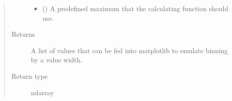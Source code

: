 \documentclass[letterpaper,10pt,english]{sphinxmanual}
\begin{document}
\begin{fulllineitems}
\begin{quote}
\begin{description}
\begin{itemize}
\item {} 
 (\sphinxstyleliteralemphasis{\sphinxupquote{ (}}\sphinxstyleliteralemphasis{\sphinxupquote{)}}) \textendash{} A predefined maximum that the calculating function should use.

\end{itemize}

\item[{Returns}] \leavevmode
{} \textendash{} A list of values that can be fed into matplotlib to emulate binning by
a value width.

\item[{Return type}] \leavevmode
ndarray

\end{description}\end{quote}

\end{fulllineitems}

\end{document}
